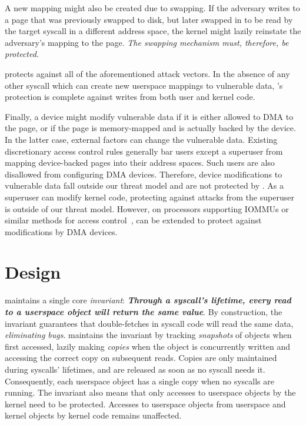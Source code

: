 \documentclass[letterpaper,twocolumn,10pt]{article}
\begin{document}
A new mapping might also be created due to swapping.
If the adversary writes to a page that was previously swapped 
to disk, but later swapped in to be read by the target syscall in 
a different address space, the kernel might lazily reinstate 
the adversary's mapping to the page.
\emph{The swapping mechanism must, therefore, be protected.}

\tiktok protects against all of the aforementioned attack vectors.
In the absence of any other syscall which can create new userspace 
mappings to vulnerable data, \tiktok's protection is complete 
against writes from both user and kernel code.

Finally, a device might modify vulnerable data if it is either 
allowed to DMA to the page, or if the page is memory-mapped and is 
actually backed by the device.
In the latter case, external factors can change the vulnerable 
data.
Existing discretionary access control rules generally bar users 
except a superuser from mapping device-backed pages into their
address spaces.
Such users are also disallowed from configuring DMA devices.
Therefore, device modifications to vulnerable data fall outside 
our threat model and are not protected by \tiktok.
As a superuser can modify kernel code, protecting against attacks from the
superuser is outside of our threat model.
However, on processors supporting IOMMUs or similar methods for 
access control~\cite{olsonbordercontrol}, \tiktok can be extended 
to protect against modifications by DMA devices.


\section{\tiktok Design} 
\label{sec:design}

\tiktok maintains a single core \emph{invariant}:
\textbf{\emph{Through a syscall's lifetime, every read to a userspace object 
will return the same value}}.
By construction, the invariant guarantees that double-fetches in syscall
code will read the same data, \emph{eliminating \tocttou bugs}.
\tiktok maintains the invariant by tracking \emph{snapshots} of objects
when first accessed, lazily making \emph{copies} when the object is concurrently 
written and accessing the correct copy on subsequent reads.
Copies are only maintained during syscalls' lifetimes, and are released as 
soon as no syscall needs it.
Consequently, each userspace object has a single copy when no syscalls are
running.
The invariant also means that only accesses to userspace objects by the kernel
need to be protected. 
Accesses to userspace objects from userspace and kernel objects by kernel 
code remains unaffected.
\end{document}
